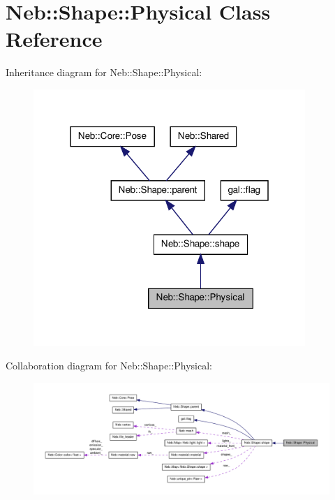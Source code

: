 \hypertarget{classNeb_1_1Shape_1_1Physical}{\section{\-Neb\-:\-:\-Shape\-:\-:\-Physical \-Class \-Reference}
\label{classNeb_1_1Shape_1_1Physical}
}


\-Inheritance diagram for \-Neb\-:\-:\-Shape\-:\-:\-Physical\-:
\nopagebreak
\begin{figure}[H]
\begin{center}
\leavevmode
\includegraphics[width=292pt]{classNeb_1_1Shape_1_1Physical__inherit__graph}
\end{center}
\end{figure}


\-Collaboration diagram for \-Neb\-:\-:\-Shape\-:\-:\-Physical\-:
\nopagebreak
\begin{figure}[H]
\begin{center}
\leavevmode
\includegraphics[width=350pt]{classNeb_1_1Shape_1_1Physical__coll__graph}
\end{center}
\end{figure}
